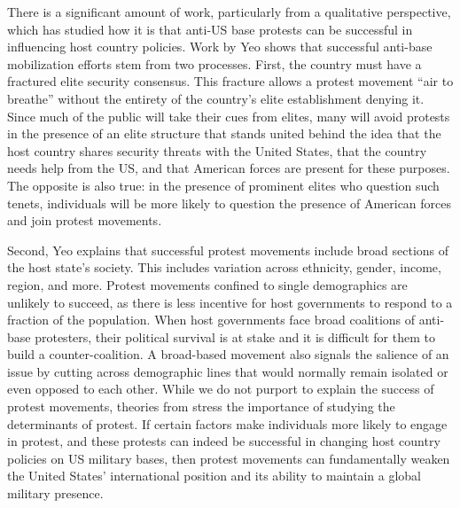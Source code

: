 {%

There is a significant amount of work, particularly from a qualitative perspective, which has studied how it is that anti-US base protests can be successful in influencing host country policies. Work by Yeo \citeyear{Yeo2011} shows that successful anti-base mobilization efforts stem from two processes. First, the country must have a fractured elite security consensus. This fracture allows a protest movement ``air to breathe'' without the entirety of the country's elite establishment denying it. Since much of the public will take their cues from elites, many will avoid protests in the presence of an elite structure that stands united behind the idea that the host country shares security threats with the United States, that the country needs help from the US, and that American forces are present for these purposes. The opposite is also true: in the presence of prominent elites who question such tenets, individuals will be more likely to question the presence of American forces and join protest movements. 

Second, Yeo explains that successful protest movements include broad sections of the host state's society. This includes variation across ethnicity, gender, income, region, and more. Protest movements confined to single demographics are unlikely to succeed, as there is less incentive for host governments to respond to a fraction of the population. When host governments face broad coalitions of anti-base protesters, their political survival is at stake and it is difficult for them to build a counter-coalition. A broad-based movement also signals the salience of an issue by cutting across demographic lines that would normally remain isolated or even opposed to each other. While we do not purport to explain the success of protest movements, theories from  stress the importance of studying the determinants of protest. If certain factors make individuals more likely to engage in protest, and these protests can indeed be successful in changing host country policies on US  military bases, then protest movements can fundamentally weaken the United States' international position and its ability to maintain a global military presence.  

	
}

